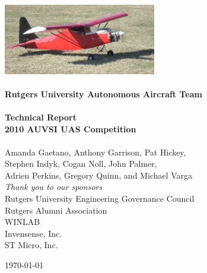 \begin{titlepage}
\begin{center}

\includegraphics[width=0.5\textwidth]{../images/daedalus.jpg}\\[1cm]
\HRule \\[1cm]
{ \huge \bfseries Rutgers University Autonomous Aircraft Team } \\[0.5cm]
\HRule \\[0.5cm]
{ \large \bfseries Technical Report }
\\[0.5cm]
{ \large \bfseries 2010 AUVSI UAS Competition }
\\[0.5cm]
\HRule \\[1cm]

  {\large Amanda Gaetano, Anthony Garrison, Pat Hickey,}
\\{\large Stephen Indyk, Cogan Noll, John Palmer,}
\\{\large Adrien Perkins, Gregory Quinn, and Michael Varga}
\\[1cm]
\emph{Thank you to our sponsors}
\\ Rutgers University Engineering Governance Council
\\ Rutgers Alumni Association
\\ WINLAB
\\ Invensense, Inc.
\\ ST Micro, Inc.

\vfill
{\large \today}

\end{center}
\end{titlepage}
